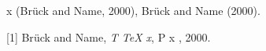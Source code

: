 x (Br{\"u}ck {and} \alpha{} Name, 2000), Br{\"u}ck {and} \alpha{} Name (2000).

\noindent
{[}1] Br{\"u}ck {and} \alpha{} Name, \emph{T {\TeX} \alpha{} x}, P {x} \beta{}, 2000.
